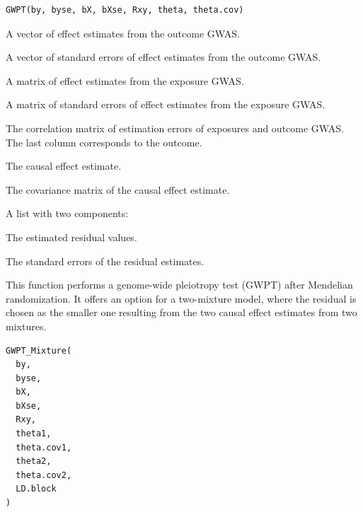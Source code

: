 \documentclass[a4paper]{book}
\begin{document}
%
\begin{Usage}
\begin{verbatim}
GWPT(by, byse, bX, bXse, Rxy, theta, theta.cov)
\end{verbatim}
\end{Usage}
%
\begin{Arguments}
\begin{ldescription}
\item[\code{by}] A vector of effect estimates from the outcome GWAS.

\item[\code{byse}] A vector of standard errors of effect estimates from the outcome GWAS.

\item[\code{bX}] A matrix of effect estimates from the exposure GWAS.

\item[\code{bXse}] A matrix of standard errors of effect estimates from the exposure GWAS.

\item[\code{Rxy}] The correlation matrix of estimation errors of exposures and outcome GWAS. The last column corresponds to the outcome.

\item[\code{theta}] The causal effect estimate.

\item[\code{theta.cov}] The covariance matrix of the causal effect estimate.
\end{ldescription}
\end{Arguments}
%
\begin{Value}
A list with two components:
\begin{ldescription}
\item[\code{BETA}] The estimated residual values.
\item[\code{SE}] The standard errors of the residual estimates.
\end{ldescription}
\end{Value}
%
\begin{Description}
This function performs a genome-wide pleiotropy test (GWPT) after Mendelian randomization. It offers an option for a two-mixture model, where the residual is chosen as the smaller one resulting from the two causal effect estimates from two mixtures.
\end{Description}
%
\begin{Usage}
\begin{verbatim}
GWPT_Mixture(
  by,
  byse,
  bX,
  bXse,
  Rxy,
  theta1,
  theta.cov1,
  theta2,
  theta.cov2,
  LD.block
)
\end{verbatim}
\end{Usage}
\end{document}

